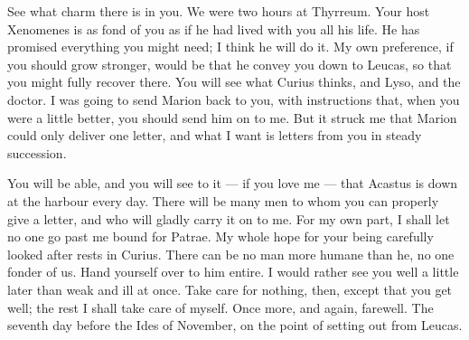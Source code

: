 

 See what charm there is in you. We were two hours at Thyrreum. Your host Xenomenes is as fond of you as if he had lived with you all his life. He has promised everything you might need; I think he will do it. My own preference, if you should grow stronger, would be that he convey you down to Leucas, so that you might fully recover there. You will see what Curius thinks, and Lyso, and the doctor. I was going to send Marion back to you, with instructions that, when you were a little better, you should send him on to me. But it struck me that Marion could only deliver one letter, and what I want is letters from you in steady succession.

 You will be able, and you will see to it --- if you love me --- that Acastus is down at the harbour every day. There will be many men to whom you can properly give a letter, and who will gladly carry it on to me. For my own part, I shall let no one go past me bound for Patrae. My whole hope for your being carefully looked after rests in Curius. There can be no man more humane than he, no one fonder of us. Hand yourself over to him entire. I would rather see you well a little later than weak and ill at once. Take care for nothing, then, except that you get well; the rest I shall take care of myself. Once more, and again, farewell. The seventh day before the Ides of November, on the point of setting out from Leucas.

